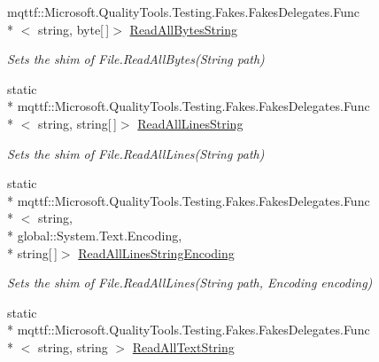 \begin{DoxyCompactItemize}
mqttf\-::\-Microsoft.\-Quality\-Tools.\-Testing.\-Fakes.\-Fakes\-Delegates.\-Func\\*
$<$ string, byte\mbox{[}$\,$\mbox{]}$>$ \hyperlink{class_system_1_1_i_o_1_1_fakes_1_1_shim_file_a4ee21ed009633a9bb64820e446e6cb0a}{Read\-All\-Bytes\-String}
\begin{DoxyCompactList}\small\item\em Sets the shim of File.\-Read\-All\-Bytes(\-String path)\end{DoxyCompactList}\item 
static \\*
mqttf\-::\-Microsoft.\-Quality\-Tools.\-Testing.\-Fakes.\-Fakes\-Delegates.\-Func\\*
$<$ string, string\mbox{[}$\,$\mbox{]}$>$ \hyperlink{class_system_1_1_i_o_1_1_fakes_1_1_shim_file_ad19170b31dcbc82659ce10dbaf7b9603}{Read\-All\-Lines\-String}
\begin{DoxyCompactList}\small\item\em Sets the shim of File.\-Read\-All\-Lines(\-String path)\end{DoxyCompactList}\item 
static \\*
mqttf\-::\-Microsoft.\-Quality\-Tools.\-Testing.\-Fakes.\-Fakes\-Delegates.\-Func\\*
$<$ string, \\*
global\-::\-System.\-Text.\-Encoding, \\*
string\mbox{[}$\,$\mbox{]}$>$ \hyperlink{class_system_1_1_i_o_1_1_fakes_1_1_shim_file_af3da5f0b25b0166e65fd1f2d7116aa7c}{Read\-All\-Lines\-String\-Encoding}
\begin{DoxyCompactList}\small\item\em Sets the shim of File.\-Read\-All\-Lines(\-String path, Encoding encoding)\end{DoxyCompactList}\item 
static \\*
mqttf\-::\-Microsoft.\-Quality\-Tools.\-Testing.\-Fakes.\-Fakes\-Delegates.\-Func\\*
$<$ string, string $>$ \hyperlink{class_system_1_1_i_o_1_1_fakes_1_1_shim_file_a82fb6941beeb31a982ee4f595ba3f003}{Read\-All\-Text\-String}

\end{DoxyCompactItemize}
